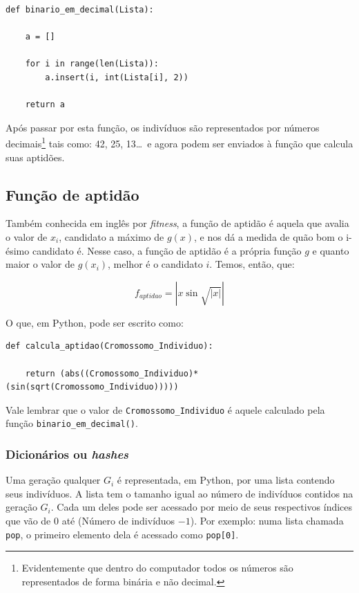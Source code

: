 \documentclass[11pt]{article}
\begin{document}
\begin{lstlisting}
def binario_em_decimal(Lista):
	
	a = []
	
	for i in range(len(Lista)):
		a.insert(i, int(Lista[i], 2))
	
	return a
\end{lstlisting}

Após passar por esta função, os indivíduos são representados por números decimais\footnote{Evidentemente que dentro do computador todos os números são representados de forma binária e não decimal.} tais como: 42, 25, 13\ldots \ e agora podem ser enviados à função que calcula suas aptidões.

\subsection{Função de aptidão}

Também conhecida em inglês por \emph{fitness}, a função de aptidão é aquela que avalia o valor de $x_i$, candidato a máximo de $g(x)$, e nos dá a medida de quão bom o i-ésimo candidato é. Nesse caso, a função de aptidão é a própria função $g$ e quanto maior o valor de $g(x_i)$, melhor é o candidato $i$. Temos, então, que:

\begin{equation*}
f_{aptidao} = \left| x \sin{\sqrt{\left| x\right| }}\right|
\end{equation*}

O que, em Python, pode ser escrito como:

\begin{lstlisting}
def calcula_aptidao(Cromossomo_Individuo):

	return (abs((Cromossomo_Individuo)*(sin(sqrt(Cromossomo_Individuo)))))
\end{lstlisting}

Vale lembrar que o valor de \texttt{Cromossomo\_Individuo} é aquele calculado pela função \texttt{binario\_em\_decimal()}.

\subsubsection{Dicionários ou \emph{hashes}}

Uma geração qualquer $G_i$ é representada, em Python, por uma lista contendo seus indivíduos. A lista tem o tamanho igual ao número de indivíduos contidos na geração $G_i$. Cada um deles pode ser acessado por meio de seus respectivos índices que vão de 0 até (Número de indivíduos $- 1$). Por exemplo: numa lista chamada \texttt{pop}, o primeiro elemento dela é acessado como \texttt{pop[0]}.
\end{document}
